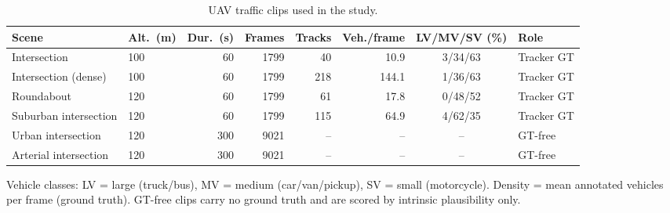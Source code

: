 \begin{table}[ht]
  \centering
  \caption{UAV traffic clips used in the study.}
  \label{tab:dataset}
  \begin{tabular}{llrrrrcl}
    \toprule
    Scene & Alt.\ (m) & Dur.\ (s) & Frames & Tracks & Veh./frame & LV/MV/SV (\%) & Role \\
    \midrule
    Intersection & 100 & 60 & 1799 & 40 & 10.9 & 3/34/63 & Tracker GT \\
    Intersection (dense) & 100 & 60 & 1799 & 218 & 144.1 & 1/36/63 & Tracker GT \\
    Roundabout & 120 & 60 & 1799 & 61 & 17.8 & 0/48/52 & Tracker GT \\
    Suburban intersection & 120 & 60 & 1799 & 115 & 64.9 & 4/62/35 & Tracker GT \\
    Urban intersection & 120 & 300 & 9021 & -- & -- & -- & GT-free \\
    Arterial intersection & 120 & 300 & 9021 & -- & -- & -- & GT-free \\
    \bottomrule
  \end{tabular}
  \par\smallskip
  \footnotesize Vehicle classes: LV = large (truck/bus), MV = medium (car/van/pickup), SV = small (motorcycle). Density = mean annotated vehicles per frame (ground truth). GT-free clips carry no ground truth and are scored by intrinsic plausibility only.
\end{table}
